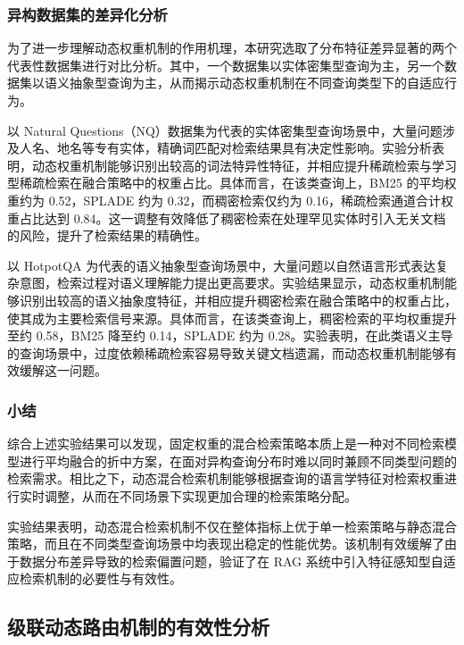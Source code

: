 \subsubsection{异构数据集的差异化分析}

为了进一步理解动态权重机制的作用机理，本研究选取了分布特征差异显著的两个代表性数据集进行对比分析。其中，一个数据集以实体密集型查询为主，另一个数据集以语义抽象型查询为主，从而揭示动态权重机制在不同查询类型下的自适应行为。

以 Natural Questions（NQ）数据集为代表的实体密集型查询场景中，大量问题涉及人名、地名等专有实体，精确词匹配对检索结果具有决定性影响。实验分析表明，动态权重机制能够识别出较高的词法特异性特征，并相应提升稀疏检索与学习型稀疏检索在融合策略中的权重占比。具体而言，在该类查询上，BM25 的平均权重约为 0.52，SPLADE 约为 0.32，而稠密检索仅约为 0.16，稀疏检索通道合计权重占比达到 0.84。这一调整有效降低了稠密检索在处理罕见实体时引入无关文档的风险，提升了检索结果的精确性。

以 HotpotQA 为代表的语义抽象型查询场景中，大量问题以自然语言形式表达复杂意图，检索过程对语义理解能力提出更高要求。实验结果显示，动态权重机制能够识别出较高的语义抽象度特征，并相应提升稠密检索在融合策略中的权重占比，使其成为主要检索信号来源。具体而言，在该类查询上，稠密检索的平均权重提升至约 0.58，BM25 降至约 0.14，SPLADE 约为 0.28。实验表明，在此类语义主导的查询场景中，过度依赖稀疏检索容易导致关键文档遗漏，而动态权重机制能够有效缓解这一问题。


\subsubsection{小结}

综合上述实验结果可以发现，固定权重的混合检索策略本质上是一种对不同检索模型进行平均融合的折中方案，在面对异构查询分布时难以同时兼顾不同类型问题的检索需求。相比之下，动态混合检索机制能够根据查询的语言学特征对检索权重进行实时调整，从而在不同场景下实现更加合理的检索策略分配。

实验结果表明，动态混合检索机制不仅在整体指标上优于单一检索策略与静态混合策略，而且在不同类型查询场景中均表现出稳定的性能优势。该机制有效缓解了由于数据分布差异导致的检索偏置问题，验证了在 RAG 系统中引入特征感知型自适应检索机制的必要性与有效性。

\subsection{级联动态路由机制的有效性分析}

